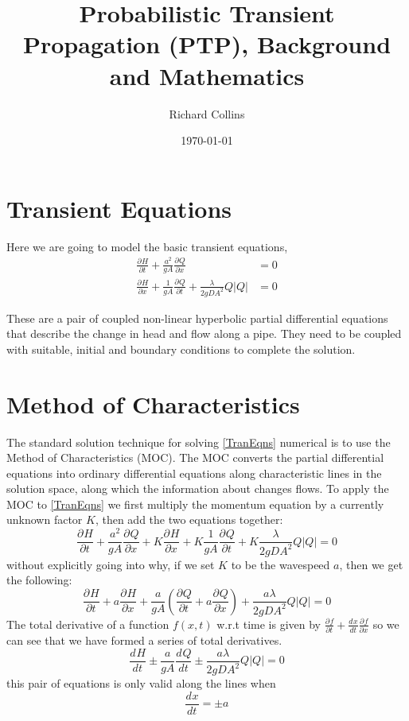 \documentclass[]{article}
\date{\today}
\title{Probabilistic Transient Propagation (PTP), Background and Mathematics}
\author{Richard Collins}
\providecommand{\diff}[3]{\frac{d^{#3} #1}{d #2^{#3}}}
\providecommand{\pdiff}[3]{\frac{\partial^{#3} #1}{\partial #2^{#3}}}
\providecommand{\abs}[1]{\left \lvert#1\right \rvert}
\begin{document}
\maketitle

\begin{abstract}
 
\end{abstract}

\section{Transient Equations}
Here we are going to model the basic transient equations, 
\begin{equation}\label{TranEqns}
 \begin{split}
 \pdiff{H}{t}{} + \frac{a^2}{gA}\pdiff{Q}{x}{} &= 0 \\
\pdiff{H}{x}{} + \frac{1}{gA}\pdiff{Q}{t}{} + \frac{\lambda}{2 g DA^2}Q \abs{Q} &= 0
 \end{split}
\end{equation}

These are a pair of coupled non-linear hyperbolic partial differential equations that describe the change in head and flow along a pipe.
They need to be coupled with suitable, initial and boundary conditions to complete the solution.

\section{Method of Characteristics}
The standard solution technique for solving \eqref{TranEqns} numerical is to use the Method of Characteristics (MOC).  
The MOC converts the partial differential equations into ordinary differential equations along characteristic lines in the solution space, along which the information about changes flows.
To apply the MOC to \eqref{TranEqns} we first multiply the momentum equation by a currently unknown factor $K$, then add the two equations together:
\begin{equation}
 \pdiff{H}{t}{} + \frac{a^2}{gA}\pdiff{Q}{x}{} + K \pdiff{H}{x}{} + K \frac{1}{gA}\pdiff{Q}{t}{} + K \frac{\lambda}{2 g DA^2}Q \abs{Q} = 0
\end{equation}
without explicitly going into why, if we set $K$ to be the wavespeed $a$, then we get the following:
\begin{equation}
 \pdiff{H}{t}{} + a \pdiff{H}{x}{} + \frac{a}{gA}\left(\pdiff{Q}{t}{} + a \pdiff{Q}{x}{} \right) + \frac{a \lambda}{2 g DA^2}Q \abs{Q} = 0
\end{equation}
The total derivative of a function $f(x,t)$ w.r.t time is given by $\pdiff{f}{t}{} + \diff{x}{t}{}\pdiff{f}{x}{}$ so we can see that we have formed a series of total derivatives.
\begin{equation}
 \diff{H}{t}{} \pm \frac{a}{gA}\diff{Q}{t}{} \pm \frac{a \lambda}{2 g DA^2}Q \abs{Q} = 0
\end{equation}
this pair of equations is only valid along the lines when 
\begin{equation}
 \diff{x}{t}{} = \pm a
\end{equation}
\end{document}
